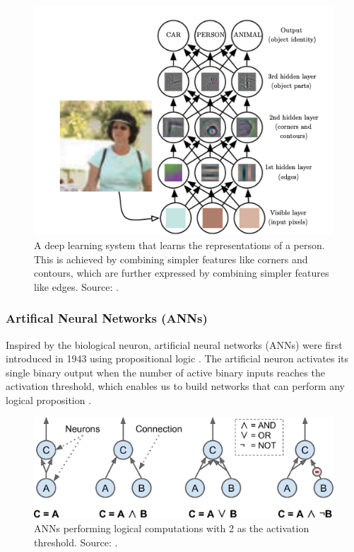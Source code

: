 \documentclass[a4paper, 11pt, oneside]{article}
\begin{document}
\begin{figure}[ht]
  \begin{center}
    \includegraphics[width=.8\textwidth]{deep_learning.png}
  \end{center}
  \caption{A deep learning system that learns the representations of a person. This is achieved by combining simpler
  features like corners and contours, which are further expressed by combining simpler features like edges. Source:
  \cite{goodfellow2016deep}.}
\end{figure}

\subsubsection{Artifical Neural Networks (ANNs)}

Inspired by the biological neuron, artificial neural networks (ANNs) were first introduced in 1943 using propositional
logic \cite{mcculloch1943logical}. The artificial neuron activates its single binary output when the number of active
binary inputs reaches the activation threshold, which enables us to build networks that can perform any logical
proposition \cite{geron2019hands, mcculloch1943logical}.

\begin{figure}[ht]
  \begin{center}
    \includegraphics[width=.5\textwidth]{ann_logic_computations.png}
  \end{center}
  \caption{ANNs performing logical computations with 2 as the activation threshold. Source: \cite{geron2019hands}.}
\end{figure}
\end{document}

